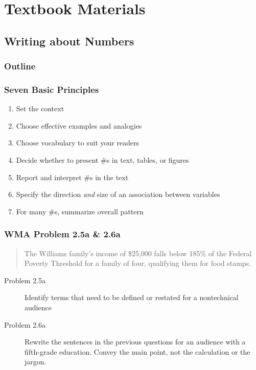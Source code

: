 \section{Textbook Materials}

\subsection{Writing about Numbers}

\begin{frame}
    \frametitle{Outline}
\end{frame}
\begin{frame}
    \frametitle{Seven Basic Principles}
     \begin{enumerate}
         \item Set the context 
         \item Choose effective examples and analogies
         \item Choose vocabulary to suit your readers
         \item Decide whether to present \#s in text, tables, or figures
         \item Report and interpret \#s in the text
         \item Specify the direction \emph{and} size of an association between variables
         \item For many \#s, summarize overall pattern 
     \end{enumerate}
\end{frame}

\begin{frame}
    \frametitle{WMA Problem 2.5a \& 2.6a}
        \begin{verse}
            The Williams family's income of \$25,000 falls below 185\% of the 
            Federal Poverty Threshold for a family of four, qualifying them
            for food stamps. 
        \end{verse}
        \vskip0.3in
\begin{description}
    \item[Problem 2.5a] {Identify terms that need to be defined or restated
        for a nontechnical audience}
    \item[Problem 2.6a] Rewrite the sentences in the previous questions for an
        audience with a fifth-grade education.  Convey the main point,
        not the calculation or the jargon. 
\end{description}
        
\end{frame}

